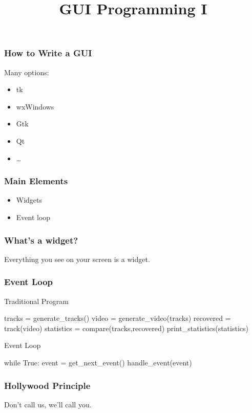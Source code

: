 
\title{GUI Programming I}

\frame{\maketitle}

\begin{frame}[fragile]
\frametitle{How to Write a GUI}
Many options:
\begin{itemize}
\item tk
\item wxWindows
\item Gtk
\item \alert<2>{Qt}
\item \ldots
\end{itemize}
\end{frame}

\begin{frame}[fragile]
\frametitle{Main Elements}
\begin{itemize}
\item Widgets
\item Event loop
\end{itemize}
\end{frame}

\begin{frame}[fragile]
\frametitle{What's a widget?}
Everything you see on your screen is a widget.
\end{frame}


\begin{frame}[fragile]
\frametitle{Event Loop}
\begin{block}{Traditional Program}
\begin{python}
tracks = generate_tracks()
video = generate_video(tracks)
recovered = track(video)
statistics = compare(tracks,recovered)
print_statistics(statistics)
\end{python}
\end{block}

\begin{block}{Event Loop}
\begin{python}
while True:
    event = get_next_event()
    handle_event(event)
\end{python}
\end{block}
\end{frame}

\begin{frame}[fragile]
\frametitle{Hollywood Principle}
Don't call us, we'll call you.
\end{frame}

